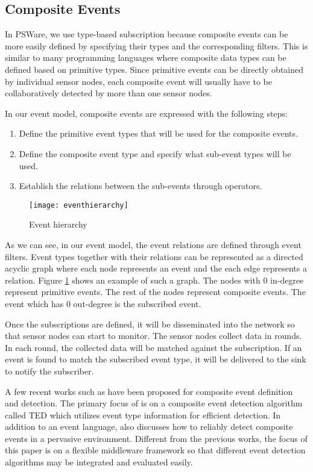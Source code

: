 \subsection{Composite Events}
In PSWare, we use type-based subscription because composite events can be more easily defined by specifying their types and the corresponding filters. This is similar to many programming languages where composite data types can be defined based on primitive types. Since primitive events can be directly obtained by individual sensor nodes, each composite event will usually have to be collaboratively detected by more than one sensor nodes. 

In our event model, composite events are expressed with the following steps:
\begin{enumerate}
\item Define the primitive event types that will be used for the composite events. 
\item Define the composite event type and specify what sub-event types will be used.
\item Establish the relations between the sub-events through operators.
\end{enumerate}

\begin{figure}
\centering
\texttt{[image: eventhierarchy]}
\caption{Event hierarchy}
\label{fig:eventhierarchy}
\end{figure}

As we can see, in our event model, the event relations are defined through event filters. Event types together with their relations can be represented as a directed acyclic graph where each node represents an event and the each edge represents a relation. Figure \ref{fig:eventhierarchy} shows an example of such a graph. The nodes with 0 in-degree represent primitive events. The rest of the nodes represent composite events. The event which has 0 out-degree is the subscribed event.

Once the subscriptions are defined, it will be disseminated into the network so that sensor nodes can start to monitor. The sensor nodes collect data in rounds. In each round, the collected data will be matched against the subscription. If an event is found to match the subscribed event type, it will be delivered to the sink to notify the subscriber.

A few recent works such as \cite{lai:ted, complexevent} have been proposed for composite event definition and detection. The primary focus of \cite{lai:ted} is on a composite event detection algorithm called TED which utilizes event type information for efficient detection. In addition to an event language, \cite{complexevent} also discusses how to reliably detect composite events in a pervasive environment. Different from the previous works, the focus of this paper is on a flexible middleware framework so that different event detection algorithms may be integrated and evaluated easily.

